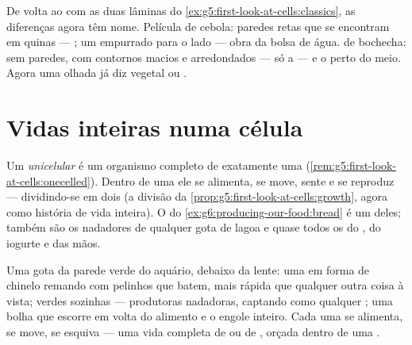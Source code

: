 \begin{example}\label{ex:g6:cell-unit-of-life:slides}
De volta ao  com as duas lâminas do
\cref{ex:g5:first-look-at-cells:classics}, as diferenças agora têm
nome. Película de cebola: paredes retas que se encontram em quinas ---
; um  empurrado para o lado --- obra da bolsa
de água.  de bochecha: sem paredes, com contornos macios e
arredondados --- só a  --- e o  perto do meio. Agora uma
olhada já diz vegetal ou .
\end{example}

\section{Vidas inteiras numa célula}

\begin{definition}\label{def:g6:cell-unit-of-life:unicellular}
Um  \emph{unicelular} é um organismo
completo de exatamente uma 
(\cref{rem:g5:first-look-at-cells:onecelled}). Dentro de uma 
ele se alimenta, se move, sente e se reproduz --- dividindo-se em dois
(a divisão da \cref{prop:g5:first-look-at-cells:growth}, agora como
história de vida inteira). O  do
\cref{ex:g6:producing-our-food:bread} é um deles; também são os
nadadores de qualquer gota de lagoa e quase todos os  do
, do iogurte e das mãos.
\end{definition}

\begin{example}\label{ex:g6:cell-unit-of-life:drop}
Uma gota da parede verde do aquário, debaixo da lente: uma  em
forma de chinelo remando com pelinhos que batem, mais rápida que
qualquer outra coisa à vista;  verdes sozinhas --- produtoras
nadadoras, captando  como qualquer ; uma bolha que escorre em
volta do alimento e o engole inteiro. Cada uma se alimenta, se move,
se esquiva --- uma vida completa de  ou de , orçada dentro
de uma .
\end{example}

